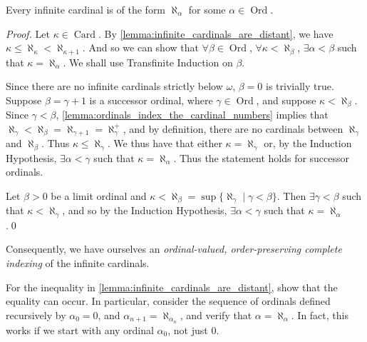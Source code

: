 \documentclass[notoc,notitlepage]{tufte-book}
\DeclareMathOperator{\Ord}{Ord }
\DeclareMathOperator{\Card}{Card }
\begin{document}
\begin{propo}\label{propo:all_infinite_cardinals_are_indexed_by_the_ordinals}
  Every infinite cardinal is of the form $\aleph_\alpha$ for some $\alpha \in \Ord$.
\end{propo}

\begin{proof}
  Let $\kappa \in \Card$. By \cref{lemma:infinite_cardinals_are_distant}, we have $\kappa \leq \aleph_\kappa < \aleph_{\kappa + 1}$. And so we can show that $\forall \beta \in \Ord$, $\forall \kappa < \aleph_\beta$, $\exists \alpha < \beta$ such that $\kappa = \aleph_\alpha$. We shall use Transfinite Induction on $\beta$.
  
  Since there are no infinite cardinals strictly below $\omega$, $\beta = 0$ is trivially true. Suppose $\beta = \gamma + 1$ is a successor ordinal, where $\gamma \in \Ord$, and suppose $\kappa < \aleph_\beta$. Since $\gamma < \beta$, \cref{lemma:ordinals_index_the_cardinal_numbers} implies that $\aleph_\gamma < \aleph_\beta = \aleph_{\gamma + 1} = \aleph_\gamma^+$, and by definition, there are no cardinals between $\aleph_\gamma$ and $\aleph_\beta$. Thus $\kappa \leq \aleph_\gamma$. We thus have that either $\kappa = \aleph_\gamma$ or, by the Induction Hypothesis, $\exists \alpha < \gamma$ such that $\kappa = \aleph_\alpha$. Thus the statement holds for successor ordinals.

  Let $\beta > 0$ be a limit ordinal and $\kappa < \aleph_\beta = \sup \{ \aleph_\gamma \mid \gamma < \beta \}$. Then $\exists \gamma < \beta$ such that $\kappa < \aleph_\gamma$, and so by the Induction Hypothesis, $\exists \alpha < \gamma$ such that $\kappa = \aleph_\alpha$.\qed\
\end{proof}

Consequently, we have ourselves an \textit{ordinal-valued, order-preserving complete indexing} of the infinite cardinals. 

\begin{ex}
  For the inequality in \cref{lemma:infinite_cardinals_are_distant}, show that the equality can occur. In particular, consider the sequence of ordinals defined recursively by $\alpha_0 = 0$, and $\alpha_{n + 1} = \aleph_{\alpha_n}$, and verify that $\alpha = \aleph_\alpha$. In fact, this works if we start with any ordinal $\alpha_0$, not just $0$.
\end{ex}




\appendix

\backmatter\

\pagestyle{plain}

\nobibliography*
% 

\printindex
\end{document}
